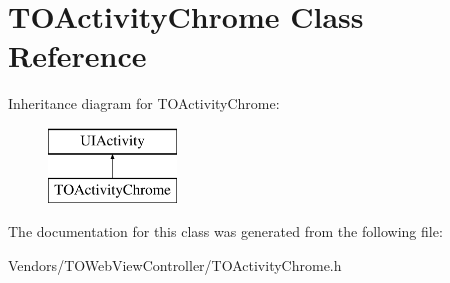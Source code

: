\hypertarget{interface_t_o_activity_chrome}{}\section{T\+O\+Activity\+Chrome Class Reference}
\label{interface_t_o_activity_chrome}
Inheritance diagram for T\+O\+Activity\+Chrome\+:\begin{figure}[H]
\begin{center}
\leavevmode
\includegraphics[height=2.000000cm]{interface_t_o_activity_chrome}
\end{center}
\end{figure}


The documentation for this class was generated from the following file\+:\begin{DoxyCompactItemize}
\item 
Vendors/\+T\+O\+Web\+View\+Controller/T\+O\+Activity\+Chrome.\+h\end{DoxyCompactItemize}
